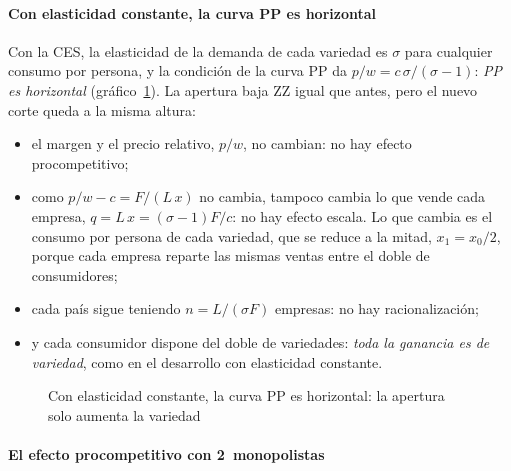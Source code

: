 \documentclass[11pt]{article}
\begin{document}
\paragraph{Con elasticidad constante, la curva PP es horizontal}

Con la CES, la elasticidad de la demanda de cada variedad es $\sigma$ para cualquier consumo por persona, y la condición de la curva PP da $p/w=c\,\sigma/(\sigma-1)$: \emph{PP es horizontal} (gráfico~\ref{fig:krugman-ppzz-ces}). La apertura baja ZZ igual que antes, pero el nuevo corte queda a la misma altura:
\begin{itemize}
\item el margen y el precio relativo, $p/w$, no cambian: no hay efecto procompetitivo;
\item como $p/w-c=F/(L\,x)$ no cambia, tampoco cambia lo que vende cada empresa, $q=L\,x=(\sigma-1)F/c$: no hay efecto escala. Lo que cambia es el consumo por persona de cada variedad, que se reduce a la mitad, $x_1=x_0/2$, porque cada empresa reparte las mismas ventas entre el doble de consumidores;
\item cada país sigue teniendo $n=L/(\sigma F)$ empresas: no hay racionalización;
\item y cada consumidor dispone del doble de variedades: \emph{toda la ganancia es de variedad}, como en el desarrollo con elasticidad constante.
\end{itemize}
\begin{figure}[H]
\centering
\caption{Con elasticidad constante, la curva PP es horizontal: la apertura solo aumenta la variedad}\label{fig:krugman-ppzz-ces}
\end{figure}

\paragraph{El efecto procompetitivo con 2~monopolistas}
\end{document}
